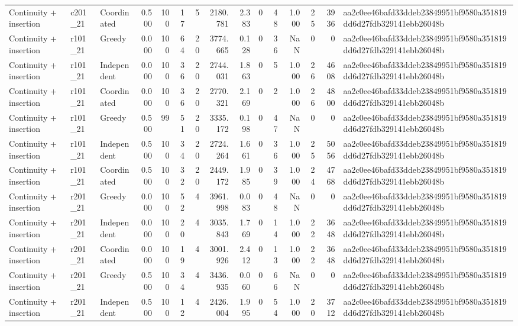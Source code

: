 \begin{tabular}{lllrrrrrrrrrrrl}
Continuity + insertion & c201\_21 & Coordinated & 0.500 & 100 & 17 & 5 & 2180.781 & 2.383 & 0 & 48 & 1.000 & 25 & 3936 & aa2c0ee46bafd33ddeb23849951bf9580a351819dd6d27fdb329141ebb26048b \\
Continuity + insertion & r101\_21 & Greedy & 0.000 & 100 & 64 & 20 & 3774.665 & 0.128 & 0 & 36 & NaN & 0 & 0 & aa2c0ee46bafd33ddeb23849951bf9580a351819dd6d27fdb329141ebb26048b \\
Continuity + insertion & r101\_21 & Independent & 0.000 & 100 & 36 & 20 & 2744.031 & 1.863 & 0 & 5 & 1.000 & 26 & 4608 & aa2c0ee46bafd33ddeb23849951bf9580a351819dd6d27fdb329141ebb26048b \\
Continuity + insertion & r101\_21 & Coordinated & 0.000 & 100 & 36 & 20 & 2770.321 & 2.169 & 0 & 2 & 1.000 & 26 & 4800 & aa2c0ee46bafd33ddeb23849951bf9580a351819dd6d27fdb329141ebb26048b \\
Continuity + insertion & r101\_21 & Greedy & 0.500 & 99 & 51 & 20 & 3335.172 & 0.198 & 0 & 47 & NaN & 0 & 0 & aa2c0ee46bafd33ddeb23849951bf9580a351819dd6d27fdb329141ebb26048b \\
Continuity + insertion & r101\_21 & Independent & 0.500 & 100 & 34 & 20 & 2724.264 & 1.661 & 0 & 36 & 1.000 & 25 & 5056 & aa2c0ee46bafd33ddeb23849951bf9580a351819dd6d27fdb329141ebb26048b \\
Continuity + insertion & r101\_21 & Coordinated & 0.500 & 100 & 32 & 20 & 2449.172 & 1.985 & 0 & 39 & 1.000 & 24 & 4768 & aa2c0ee46bafd33ddeb23849951bf9580a351819dd6d27fdb329141ebb26048b \\
Continuity + insertion & r201\_21 & Greedy & 0.000 & 100 & 52 & 4 & 3961.998 & 0.083 & 0 & 48 & NaN & 0 & 0 & aa2c0ee46bafd33ddeb23849951bf9580a351819dd6d27fdb329141ebb26048b \\
Continuity + insertion & r201\_21 & Independent & 0.000 & 100 & 20 & 4 & 3035.843 & 1.769 & 0 & 14 & 1.000 & 22 & 3648 & aa2c0ee46bafd33ddeb23849951bf9580a351819dd6d27fdb329141ebb26048b \\
Continuity + insertion & r201\_21 & Coordinated & 0.000 & 100 & 19 & 4 & 3001.926 & 2.412 & 0 & 13 & 1.000 & 22 & 3648 & aa2c0ee46bafd33ddeb23849951bf9580a351819dd6d27fdb329141ebb26048b \\
Continuity + insertion & r201\_21 & Greedy & 0.500 & 100 & 34 & 4 & 3436.935 & 0.060 & 0 & 66 & NaN & 0 & 0 & aa2c0ee46bafd33ddeb23849951bf9580a351819dd6d27fdb329141ebb26048b \\
Continuity + insertion & r201\_21 & Independent & 0.500 & 100 & 12 & 4 & 2426.004 & 1.995 & 0 & 54 & 1.000 & 20 & 3712 & aa2c0ee46bafd33ddeb23849951bf9580a351819dd6d27fdb329141ebb26048b \\

\end{tabular}
